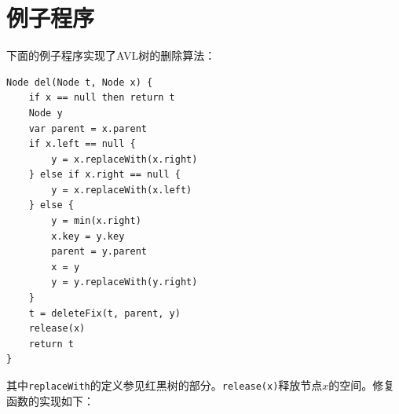 \documentclass[b5paper]{ctexart}
\begin{document}
\begin{Exercise}
\end{Exercise}

\section{例子程序}

下面的例子程序实现了AVL树的删除算法：

\begin{lstlisting}[language = Bourbaki]
Node del(Node t, Node x) {
    if x == null then return t
    Node y
    var parent = x.parent
    if x.left == null {
        y = x.replaceWith(x.right)
    } else if x.right == null {
        y = x.replaceWith(x.left)
    } else {
        y = min(x.right)
        x.key = y.key
        parent = y.parent
        x = y
        y = y.replaceWith(y.right)
    }
    t = deleteFix(t, parent, y)
    release(x)
    return t
}
\end{lstlisting}

其中\texttt{replaceWith}的定义参见红黑树的部分。\texttt{release(x)}释放节点$x$的空间。修复函数的实现如下：
\end{document}
